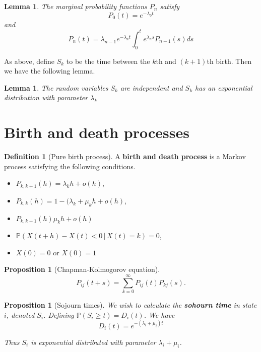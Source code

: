 \documentclass[10pt, oneside, reqno]{amsart}
\theoremstyle{plain}%
\newtheorem{lem}[thm]{Lemma}
\newtheorem{prop}[thm]{Proposition}
\theoremstyle{definition}
\newtheorem{defn}[thm]{Definition}
\theoremstyle{remark}
\newcommand{\prob}[1]{\mathbb{P}(#1)}
\newcommand{\given}{ \, | \,}
\begin{document}
\begin{lem}
    The marginal probability functions $P_n$ satisfy \[
        P_0(t) = e^{-\lambda_0 t}
    \] and \[
        P_n(t) = \lambda_{n-1} e^{-\lambda_n t} \int_0^t e^{\lambda_n s} P_{n-1}(s) ds
    \]
\end{lem}

As above, define $S_k$ to be the time between the $k$th and $(k+1)$th birth.  Then we have the following lemma.

\begin{lem}
    The random variables $S_k$ are independent and $S_k$ has an exponential distribution with parameter $\lambda_k$
\end{lem}


\section{Birth and death processes} %
\label{sub:birth_and_death_processes}
\begin{defn}[Pure birth process]
    A \textbf{birth and death process} is a Markov process satisfying the following conditions.
    \begin{itemize}
        \item $P_{k,k+1}(h) = \lambda_k h + o(h)$,
        \item $P_{k,k}(h) = 1 - (\lambda_k + \mu_k h + o(h)$,
        \item $P_{k,k-1}(h) \mu_k h + o(h)$
        \item $\prob{X(t+h) - X(t) < 0 \given X(t) = k} = 0$,
        \item $X(0) = 0$ or $X(0) = 1$
    \end{itemize}
\end{defn}

\begin{prop}[Chapman-Kolmogorov equation]
    \[
        P_{ij}(t+s) = \sum_{k=0}^\infty P_{ij}(t) P_{kj}(s).
    \]
\end{prop}

\begin{prop}[Sojourn times]
    We wish to calculate the \textbf{sohourn time} in state $i$, denoted $S_i$.  Defining $\prob{S_i \geq t} = D_i(t)$. We have \[
        D_i(t) = e^{-(\lambda_i + \mu_i)t}
    \]
    
    Thus $S_i$ is exponential distributed with parameter $\lambda_i + \mu_i$.
\end{prop}
\end{document}
